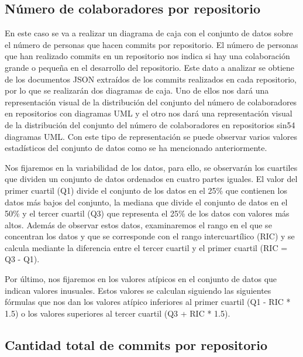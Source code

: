\documentclass[a4paper, 12pt]{book}
\begin{document}
\subsection{Número de colaboradores por repositorio} %
\label{sec:número de colaboradores por repositorio}

En este caso se va a realizar un diagrama de caja con el conjunto de datos sobre el número de personas que hacen commits por repositorio.
El número de personas que han realizado commits en un repositorio nos indica si hay una colaboración grande o pequeña en el desarrollo del repositorio.
Este dato a analizar se obtiene de los documentos JSON extraídos de los commits realizados en cada repositorio, por lo que se realizarán dos diagramas de caja.
Uno de ellos nos dará una representación visual de la distribución del conjunto del número de colaboradores en repositorios con diagramas UML y el otro nos dará una representación visual de la distribución del conjunto del número de colaboradores en repositorios sin54 diagramas UML.
Con este tipo de representación se puede observar varios valores estadísticos del conjunto de datos como se ha mencionado anteriormente.


Nos fijaremos en la variabilidad de los datos, para ello, se observarán los cuartiles que dividen un conjunto de datos ordenados en cuatro partes iguales.
El valor del primer cuartil (Q1) divide el conjunto de los datos en el 25\% que contienen los datos más bajos del conjunto, la mediana que divide el conjunto de datos en el 50\% y el tercer cuartil (Q3) que representa el 25\% de los datos con valores más altos.
Además de observar estos datos, examinaremos el rango en el que se concentran los datos y que se corresponde con el rango intercuartílico (RIC) y se calcula mediante la diferencia entre el tercer cuartil y el primer cuartil (RIC = Q3 - Q1).


Por último, nos fijaremos en los valores atípicos en el conjunto de datos que indican valores inusuales.
Estos valores se calculan siguiendo las siguientes fórmulas que nos dan los valores atípico inferiores al primer cuartil (Q1 - RIC * 1.5)  o los valores superiores al tercer cuartil (Q3 + RIC * 1.5). 



\subsection{Cantidad total de commits por repositorio} %
\label{sec:cantidad total de commits por repositorio}
\end{document}
